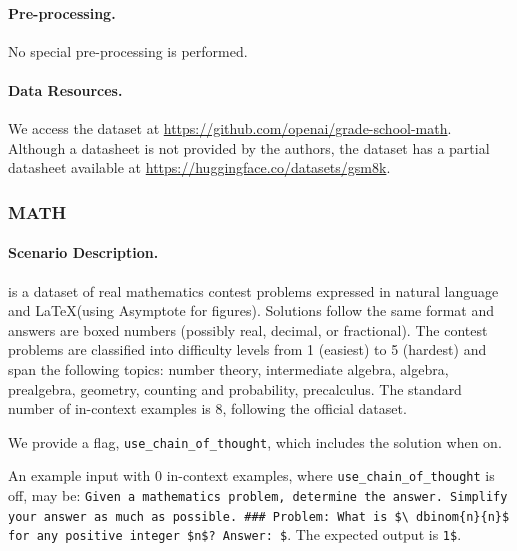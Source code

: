 \paragraph{Pre-processing.}
No special pre-processing is performed.

\paragraph{Data Resources.}
We access the dataset at \url{https://github.com/openai/grade-school-math}.
Although a datasheet is not provided by the authors, the dataset has a partial datasheet available at \url{https://huggingface.co/datasets/gsm8k}.

\subsubsection{MATH}
\paragraph{Scenario Description.} \MATH \citep{hendrycksmath2021} is a dataset of real mathematics contest problems expressed in natural language and \LaTeX (using Asymptote for figures). Solutions follow the same format and answers are boxed numbers (possibly real, decimal, or fractional). The contest problems are classified into difficulty levels from 1 (easiest) to 5 (hardest) and span the following topics: number theory, intermediate algebra, algebra, prealgebra, geometry, counting and probability, precalculus. The standard number of in-context examples is 8, following the official dataset.

We provide a flag, \texttt{use\_chain\_of\_thought}, which includes the solution when on.

An example input with 0 in-context examples, where \texttt{use\_chain\_of\_thought} is off, may be: \texttt{Given a mathematics problem, determine the answer. Simplify your answer as much as possible.
\#\#\#
Problem: What is \$\textbackslash~dbinom\{n\}\{n\}\$ for any positive integer \$n\$?
Answer: \$}. The expected output is \texttt{1\$}.

